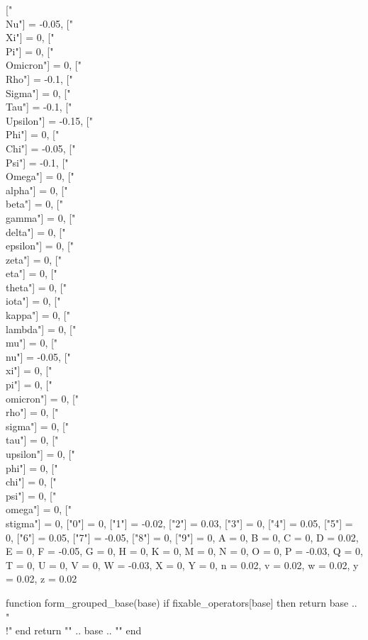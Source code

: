 {{        ["\\Nu"] = -0.05, ["\\Xi"] = 0, ["\\Pi"] = 0,
        ["\\Omicron"] = 0, ["\\Rho"] = -0.1, ["\\Sigma"] = 0,
        ["\\Tau"] = -0.1, ["\\Upsilon"] = -0.15, ["\\Phi"] = 0,
        ["\\Chi"] = -0.05, ["\\Psi"] = -0.1, ["\\Omega"] = 0,
        ["\\alpha"] = 0, ["\\beta"] = 0, ["\\gamma"] = 0,
        ["\\delta"] = 0, ["\\epsilon"] = 0, ["\\zeta"] = 0,
        ["\\eta"] = 0, ["\\theta"] = 0, ["\\iota"] = 0,
        ["\\kappa"] = 0, ["\\lambda"] = 0, ["\\mu"] = 0,
        ["\\nu"] = -0.05, ["\\xi"] = 0, ["\\pi"] = 0,
        ["\\omicron"] = 0, ["\\rho"] = 0, ["\\sigma"] = 0,
        ["\\tau"] = 0, ["\\upsilon"] = 0, ["\\phi"] = 0,
        ["\\chi"] = 0, ["\\psi"] = 0, ["\\omega"] = 0, ["\\stigma"] = 0,
        ["0"] = 0, ["1"] = -0.02, ["2"] = 0.03, ["3"] = 0, ["4"] = 0.05,
        ["5"] = 0, ["6"] = 0.05, ["7"] = -0.05, ["8"] = 0, ["9"] = 0,
        A = 0, B = 0, C = 0, D = 0.02, E = 0, F = -0.05,
        G = 0, H = 0, K = 0, M = 0, N = 0, O = 0, P = -0.03,
        Q = 0, T = 0, U = 0, V = 0, W = -0.03, X = 0, Y = 0,
        n = 0.02, v = 0.02, w = 0.02, y = 0.02, z = 0.02
    }

    function form_grouped_base(base)
        if fixable_operators[base] then
            return base .. " {\\!}"
        end
        return "{" .. base .. "}"
    end
}

